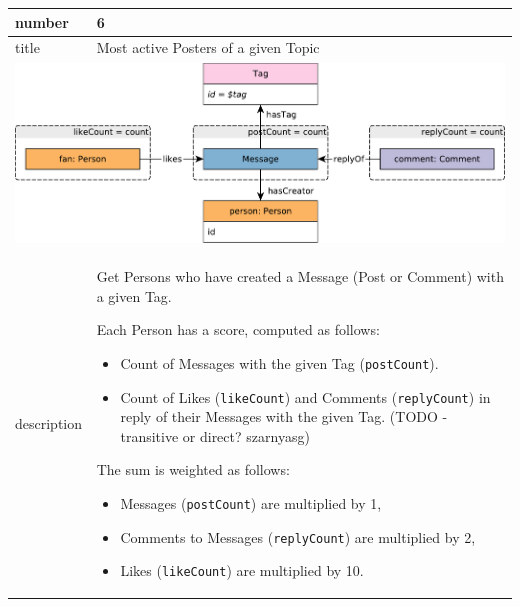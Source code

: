 \renewcommand*{\arraystretch}{1.1}

\noindent\begin{tabularx}{17cm}{|p{1.95cm}|X|}
	\hline
	number      & 6                                                          \\ \hline
%
	title       & Most active Posters of a given Topic                                                           \\ \hline
	\multicolumn{2}{|c|}{ \includegraphics[scale=\patternscale,margin=0cm .2cm]{patterns/q06}} \\ \hline
	description & Get Persons who have created a Message (Post or Comment) with a given
Tag.

Each Person has a score, computed as follows:

\begin{itemize}
\tightlist
\item
  Count of Messages with the given Tag (\texttt{postCount}).
\item
  Count of Likes (\texttt{likeCount}) and Comments (\texttt{replyCount})
  in reply of their Messages with the given Tag. (TODO - transitive or
  direct? szarnyasg)
\end{itemize}

The sum is weighted as follows:

\begin{itemize}
\tightlist
\item
  Messages (\texttt{postCount}) are multiplied by 1,
\item
  Comments to Messages (\texttt{replyCount}) are multiplied by 2,
\item
  Likes (\texttt{likeCount}) are multiplied by 10.
\end{itemize}
 \\ \hline
	

\end{tabularx}
